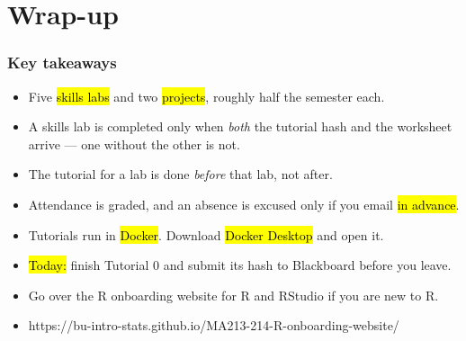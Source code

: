 \documentclass[slidestop,compress,mathserif]{beamer}
\begin{document}
\section{Wrap-up}
\begin{frame}
\frametitle{Key takeaways}

\begin{itemize}
\item Five \hl{skills labs} and two \hl{projects}, roughly half the semester each.
\item A skills lab is completed only when \emph{both} the tutorial hash and the
  worksheet arrive --- one without the other is not.
\item The tutorial for a lab is done \emph{before} that lab, not after.
\item Attendance is graded, and an absence is excused only if you email
  \hl{in advance}.
\item Tutorials run in \hl{Docker}. Download \hl{Docker Desktop} and open it. 
\item \hl{Today:} finish Tutorial 0 and submit its hash to Blackboard before
  you leave.
\item Go over the R onboarding website for R and RStudio if you are new to R.
\item https://bu-intro-stats.github.io/MA213-214-R-onboarding-website/
\end{itemize}

\end{frame}

\end{document}
